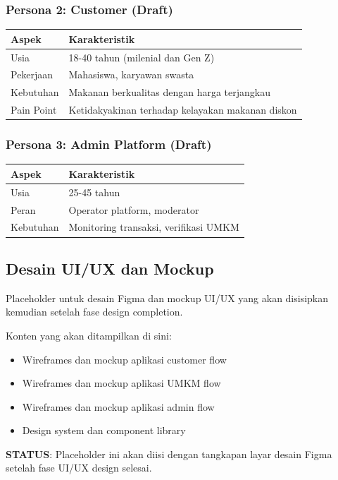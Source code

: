 \subsubsection{Persona 2: Customer (Draft)}
\begin{table}[H]
\centering
\begin{tabularx}{0.8\textwidth}{|l|X|}
\hline
\textbf{Aspek} & \textbf{Karakteristik} \\
\hline
Usia & 18-40 tahun (milenial dan Gen Z) \\
\hline
Pekerjaan & Mahasiswa, karyawan swasta \\
\hline
Kebutuhan & Makanan berkualitas dengan harga terjangkau \\
\hline
Pain Point & Ketidakyakinan terhadap kelayakan makanan diskon \\
\hline
\end{tabularx}
\end{table}

\subsubsection{Persona 3: Admin Platform (Draft)}
\begin{table}[H]
\centering
\begin{tabularx}{0.8\textwidth}{|l|X|}
\hline
\textbf{Aspek} & \textbf{Karakteristik} \\
\hline
Usia & 25-45 tahun \\
\hline
Peran & Operator platform, moderator \\
\hline
Kebutuhan & Monitoring transaksi, verifikasi UMKM \\
\hline
\end{tabularx}
\end{table}

\subsection{Desain UI/UX dan Mockup}

Placeholder untuk desain Figma dan mockup UI/UX yang akan disisipkan kemudian setelah fase design completion.

Konten yang akan ditampilkan di sini:
\begin{itemize}[leftmargin=*]
    \item Wireframes dan mockup aplikasi customer flow
    \item Wireframes dan mockup aplikasi UMKM flow
    \item Wireframes dan mockup aplikasi admin flow
    \item Design system dan component library
\end{itemize}

\textbf{STATUS}: Placeholder ini akan diisi dengan tangkapan layar desain Figma setelah fase UI/UX design selesai.
